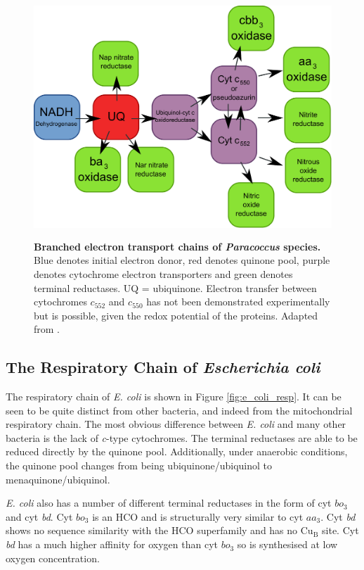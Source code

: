 \begin{figure}[tbp]
\begin{center}
	\includegraphics[height=9cm]{01-introduction/data/paracoccus_resp.pdf}
	\caption[{\bf Branched electron transport chains of \textit{Paracoccus} species.}]{{\bf Branched electron transport chains of \textit{Paracoccus} species.} Blue denotes initial electron donor, red denotes quinone pool, purple denotes cytochrome electron transporters and green denotes terminal reductases. UQ = ubiquinone. Electron transfer between cytochromes $c_{552}$ and $c_{550}$ has not been demonstrated experimentally but is possible, given the redox potential of the proteins. Adapted from \citet{Baker1998}.
	\label{fig:paracoccus_resp}}
\end{center}
\end{figure}

\subsection{The Respiratory Chain of \textit{Escherichia coli}}
The respiratory chain of \textit{E. coli} is shown in Figure \ref{fig:e_coli_resp}. It can be seen to be quite distinct from other bacteria, and indeed from the mitochondrial respiratory chain. The most obvious difference between \textit{E. coli} and many other bacteria is the lack of \textit{c}-type cytochromes. The terminal reductases are able to be reduced directly by the quinone pool. Additionally, under anaerobic conditions, the quinone pool changes from being ubiquinone/ubiquinol to menaquinone/ubiquinol.

\textit{E. coli} also has a number of different terminal reductases in the form of cyt $bo_3$ and cyt \textit{bd}. Cyt $bo_3$ is an HCO and is structurally very similar to cyt $aa_3$. Cyt \textit{bd} shows no sequence similarity with the HCO superfamily and has no $\mathrm{Cu}_\mathrm{B}$ site. Cyt \textit{bd} has a much higher affinity for oxygen than cyt $bo_3$ so is synthesised at low oxygen concentration.

